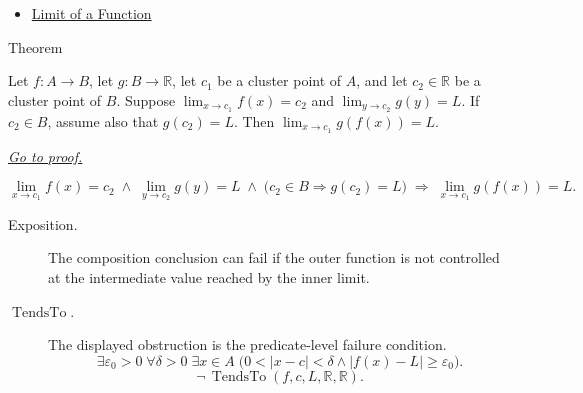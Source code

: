 \begin{dependencies}
\begin{itemize}
  \item \hyperref[def:limit-function]{Limit of a Function}
\end{itemize}
\end{dependencies}


\begin{theorembox}{Theorem}
\begin{theorem}
\label{thm:composition-of-limits}
Let $f : A \to B$, let $g : B \to \mathbb{R}$, let $c_1$ be a
cluster point of $A$, and let $c_2 \in \mathbb{R}$ be a cluster
point of $B$. Suppose $\lim_{x\to c_1}f(x)=c_2$ and
$\lim_{y\to c_2}g(y)=L$. If $c_2 \in B$, assume also that
$g(c_2) = L$. Then $\lim_{x\to c_1}g(f(x))=L$.

\smallskip\noindent
\hyperref[prf:composition-of-limits]{\textit{Go to proof.}}
\end{theorem}
\end{theorembox}

\begin{remark*}
\[
  \lim_{x\to c_1}f(x)=c_2
  \;\wedge\;
  \lim_{y\to c_2}g(y)=L
  \;\wedge\;
  \bigl(c_2 \in B \Rightarrow g(c_2) = L\bigr)
  \;\Rightarrow\;
  \lim_{x\to c_1}g(f(x))=L.
\]
\end{remark*}

\begin{remark*}
\begin{description}
  \item[Exposition.]
The composition conclusion can fail if the outer function is not controlled
at the intermediate value reached by the inner limit.


  \item[\(\operatorname{TendsTo}.\)]
  The displayed obstruction is the predicate-level failure condition.
  \[
  \exists\varepsilon_0>0\;\forall\delta>0\;\exists x\in A\;
  \bigl(0<|x-c|<\delta\land |f(x)-L|\ge\varepsilon_0\bigr).
  \]
  \[
  \neg\,\operatorname{TendsTo}(f,c,L,\mathbb{R},\mathbb{R}).
  \]
\end{description}
\end{remark*}

